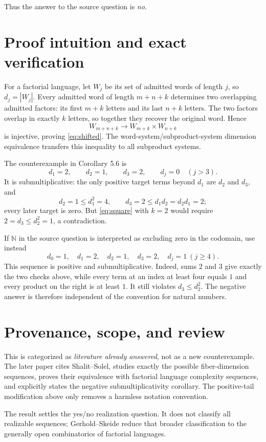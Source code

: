 \documentclass[11pt]{article}
\begin{document}
Thus the answer to the source question is \emph{no}.

\section{Proof intuition and exact verification}

For a factorial language, let $W_j$ be its set of admitted words of length
$j$, so $d_j=|W_j|$.  Every admitted word of length $m+n+k$ determines two
overlapping admitted factors: its first $m+k$ letters and its last $n+k$
letters.  The two factors overlap in exactly $k$ letters, so together they
recover the original word.  Hence
\[
 W_{m+n+k}\longrightarrow W_{m+k}\times W_{n+k}
\]
is injective, proving \eqref{eq:shifted}.  The word-system/subproduct-system
dimension equivalence transfers this inequality to all subproduct systems.

The counterexample in Corollary 5.6 is
\[
 d_1=2,\qquad d_2=1,\qquad d_3=2,\qquad d_j=0\quad(j>3).
\]
It is submultiplicative: the only positive target terms beyond $d_1$ are
$d_2$ and $d_3$, and
\[
 d_2=1\le d_1^2=4,\qquad
 d_3=2\le d_1d_2=d_2d_1=2;
\]
every later target is zero.  But \eqref{eq:square} with $k=2$ would require
$2=d_3\le d_2^2=1$, a contradiction.

If $\mathbb N$ in the source question is interpreted as excluding zero in
the codomain, use instead
\[
 d_0=1,\quad d_1=2,\quad d_2=1,\quad d_3=2,\quad d_j=1\ (j\ge4).
\]
This sequence is positive and submultiplicative.  Indeed, sums $2$ and $3$
give exactly the two checks above, while every term at an index at least
four equals $1$ and every product on the right is at least $1$.  It still
violates $d_3\le d_2^2$.  The negative answer is therefore independent of
the convention for natural numbers.

\section{Provenance, scope, and review}

This is categorized as \emph{literature already answered}, not as a new
counterexample.  The later paper cites Shalit--Solel, studies exactly the
possible fiber-dimension sequences, proves their equivalence with factorial
language complexity sequences, and explicitly states the negative
submultiplicativity corollary.  The positive-tail modification above only
removes a harmless notation convention.

The result settles the yes/no realization question.  It does not classify
all realizable sequences; Gerhold--Skeide reduce that broader classification
to the generally open combinatorics of factorial languages.
\end{document}
